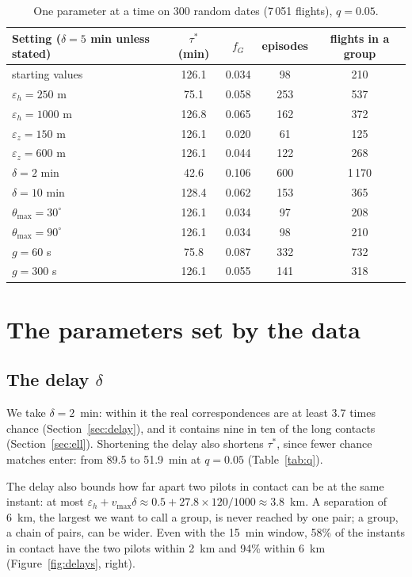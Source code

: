 \documentclass[11pt,a4paper]{article}
\begin{document}
\begin{table}[h]
\centering
\small
\begin{tabular}{@{}l c c c c@{}}
\toprule
Setting ($\delta=5$ min unless stated) & $\tau^*$ (min) & $f_G$ & episodes & flights in a group \\
\midrule
starting values & 126.1 & 0.034 & 98 & 210 \\
$\varepsilon_h=250$ m & 75.1 & 0.058 & 253 & 537 \\
$\varepsilon_h=1000$ m & 126.8 & 0.065 & 162 & 372 \\
$\varepsilon_z=150$ m & 126.1 & 0.020 & 61 & 125 \\
$\varepsilon_z=600$ m & 126.1 & 0.044 & 122 & 268 \\
$\delta=2$ min & 42.6 & 0.106 & 600 & 1\,170 \\
$\delta=10$ min & 128.4 & 0.062 & 153 & 365 \\
$\theta_{\max}=30^\circ$ & 126.1 & 0.034 & 97 & 208 \\
$\theta_{\max}=90^\circ$ & 126.1 & 0.034 & 98 & 210 \\
$g=60$ s & 75.8 & 0.087 & 332 & 732 \\
$g=300$ s & 126.1 & 0.055 & 141 & 318 \\
\bottomrule
\end{tabular}
\caption{One parameter at a time on 300 random dates (7\,051 flights), $q=0.05$.}
\label{tab:plateau}
\end{table}

\section{The parameters set by the data}

\subsection{The delay $\delta$}\label{sec:delta-choice}

We take $\delta=2$~min: within it the real correspondences are at least 3.7 times chance
(Section~\ref{sec:delay}), and it contains nine in ten of the long contacts
(Section~\ref{sec:ell}). Shortening the delay also
shortens $\tau^*$, since fewer chance matches enter: from 89.5 to 51.9~min at $q=0.05$
(Table~\ref{tab:q}).

The delay also bounds how far apart two pilots in contact can be at the same instant: at most
$\varepsilon_h+v_{\max}\delta\approx0.5+27.8\times120/1000\approx3.8$~km. A
separation of 6~km, the largest we want to call a group, is never reached by one pair; a
group, a chain of pairs, can be wider. Even with the 15~min window, 58\% of the instants in
contact have the two pilots within 2~km and 94\% within 6~km (Figure~\ref{fig:delays},
right).
\end{document}
